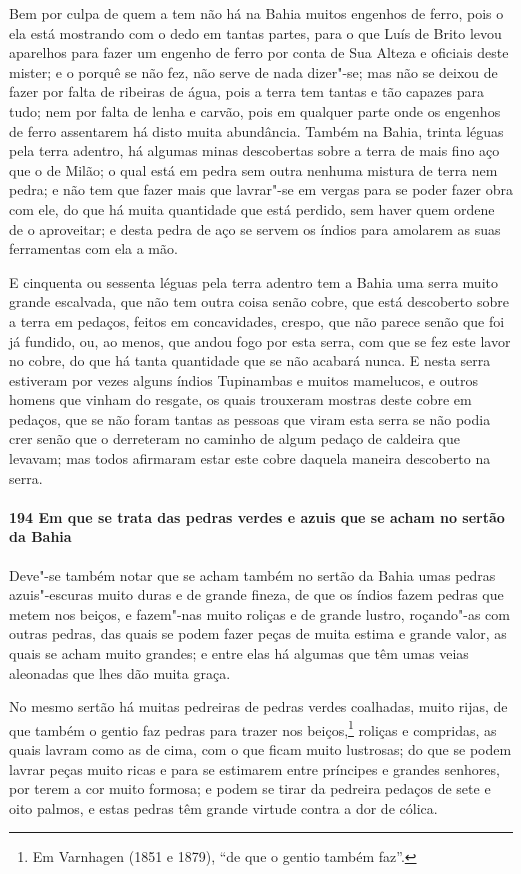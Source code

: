 Bem por culpa de quem a tem não há na Bahia muitos engenhos de ferro, pois o ela está
mostrando com o dedo em tantas partes, para o que Luís de Brito levou aparelhos para fazer
um engenho de ferro por conta de Sua Alteza e oficiais deste mister; e o porquê se não
fez, não serve de nada dizer"-se; mas não se deixou de fazer por falta de ribeiras de água,
pois a terra tem tantas e tão capazes para tudo; nem por falta de lenha e carvão, pois em
qualquer parte onde os engenhos de ferro assentarem há disto muita abundância. Também na
Bahia, trinta léguas pela terra adentro, há algumas minas descobertas sobre a terra de
mais fino aço que o de Milão; o qual está em pedra sem outra nenhuma mistura de terra nem
pedra; e não tem que fazer mais que lavrar"-se em vergas para se poder fazer obra com ele,
do que há muita quantidade que está perdido, sem haver quem ordene de o aproveitar; e
desta pedra de aço se servem os índios para amolarem as suas ferramentas com ela a mão.

E cinquenta ou sessenta léguas pela terra adentro tem a Bahia uma serra muito grande
escalvada, que não tem outra coisa senão cobre, que está descoberto sobre a terra em
pedaços, feitos em concavidades, crespo, que não parece senão que foi já fundido, ou, ao
menos, que andou fogo por esta serra, com que se fez este lavor no cobre, do que há tanta
quantidade que se não acabará nunca. E nesta serra estiveram por vezes alguns índios
Tupinambas e muitos mamelucos, e outros homens que vinham do resgate, os quais trouxeram
mostras deste cobre em pedaços, que se não foram tantas as pessoas que viram esta serra se
não podia crer senão que o derreteram no caminho de algum pedaço de caldeira que levavam;
mas todos afirmaram estar este cobre daquela maneira descoberto na serra.

\paragraph{194 Em que se trata das pedras verdes e azuis que se acham no sertão da Bahia}

Deve"-se também notar que se acham também no sertão da Bahia umas pedras azuis"-escuras
muito duras e de grande fineza, de que os índios fazem pedras que metem nos beiços, e
fazem"-nas muito roliças e de grande lustro, roçando"-as com outras pedras, das quais se
podem fazer peças de muita estima e grande valor, as quais se acham muito grandes; e entre
elas há algumas que têm umas veias aleonadas que lhes dão muita graça.

No mesmo sertão há muitas pedreiras de pedras verdes coalhadas, muito rijas, de que também
o gentio faz pedras para trazer nos beiços,\footnote{ Em Varnhagen (1851 e 1879), ``de que
o gentio também faz''.} roliças e compridas, as quais lavram como as de cima, com o que
ficam muito lustrosas; do que se podem lavrar peças muito ricas e para se estimarem entre
príncipes e grandes senhores, por terem a cor muito formosa; e podem se tirar da pedreira
pedaços de sete e oito palmos, e estas pedras têm grande virtude contra a dor de cólica.

